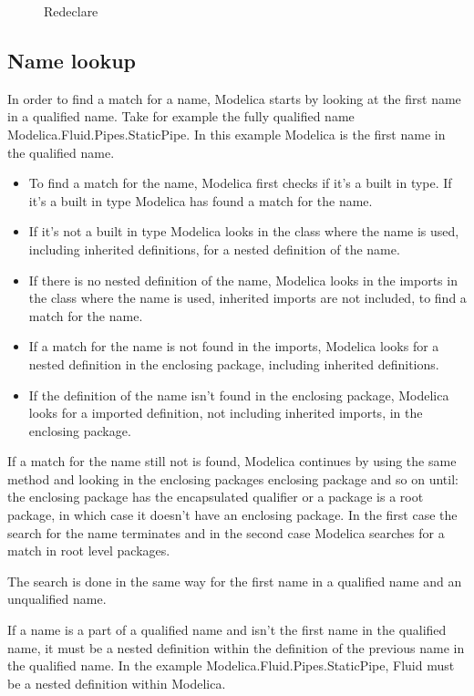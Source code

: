 \documentclass{cslthse-msc}
\begin{document}
\begin{figure}[H]
	
    \caption{Redeclare}
    \label{fig:redeclare}
\end{figure}

\subsection{Name lookup}
In order to find a match for a name, Modelica starts by looking at the first name in a qualified name. Take for example the fully qualified name Modelica.Fluid.Pipes.StaticPipe. In this example Modelica is the first name in the qualified name.
\begin{itemize}
\item To find a match for the name, Modelica first checks if it's a built in type. If it's a built in type Modelica has found a match for the name.

\item If it's not a built in type Modelica looks in the class where the name is used, including inherited definitions, for a nested definition of the name. 

\item If there is no nested definition of the name, Modelica looks in the imports in the class where the name is used, inherited imports are not included, to find a match for the name.

\item If a match for the name is not found in the imports, Modelica looks for a nested definition in the enclosing package, including inherited definitions.

\item If the definition of the name isn't found in the enclosing package, Modelica looks for a imported definition, not including inherited imports, in the enclosing package.
\end{itemize}
If a match for the name still not is found, Modelica continues by using the same method and looking in the enclosing packages enclosing package and so on until: the enclosing package has the encapsulated qualifier or a package is a root package, in which case it doesn't have an enclosing package. In the first case the search for the name terminates and in the second case Modelica searches for a match in root level packages.

The search is done in the same way for the first name in a qualified name and an unqualified name.

If a name is a part of a qualified name and isn't the first name in the qualified name, it must be a nested definition within the definition of the previous name in the qualified name. In the example Modelica.Fluid.Pipes.StaticPipe, Fluid must be a nested definition within Modelica.\cite{modelicamodelica, tillermodelica}
\end{document}
